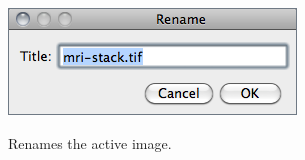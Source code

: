 \subsection{\protect{}\label{sub:Rename...}}

\begin{minipage}[c][1\totalheight][t]{0.41\columnwidth}%
\includegraphics[scale=0.55]{images/Rename}%
\end{minipage}%
\begin{minipage}[c][1\totalheight][t]{0.59\columnwidth}%
Renames the active image.


%
\end{minipage}


\subsection[{\protect\userinterface{Scale\ldots{}\ {[}E{]}}}]{\protect{}\label{sub:Scale...[E]}}

